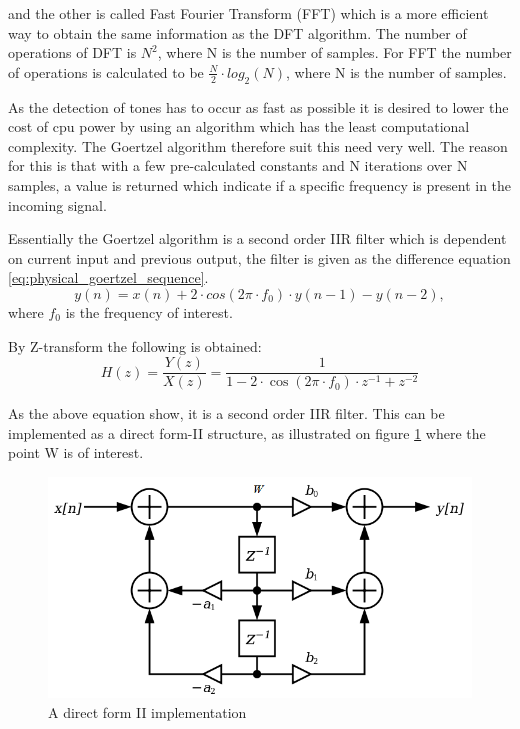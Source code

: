 	
	and the other is called Fast Fourier Transform (FFT) which is a more efficient way to obtain the same information
	as the DFT algorithm. The number of operations of DFT \cite[p. 124]{DSP} is $N^2$, where N is the number of samples.
	For FFT \cite[p. 124]{DSP} the number of operations is calculated to be $\frac{N}{2}\cdot log_{2}(N)$,
	where N is the number of samples.
	
	As the detection of tones has to occur as fast as possible it is desired to lower the cost of cpu power by using 
	an algorithm which has the least computational complexity. The Goertzel algorithm therefore suit this need very well.
	The reason for this is that with a few pre-calculated constants and N iterations over N samples, a value is returned
	which indicate if a specific frequency is present in the incoming signal.
	
	Essentially the Goertzel algorithm is a second order IIR filter which is dependent on current input and previous
	output, the filter is given as the difference equation \ref{eq:physical_goertzel_sequence}.
	\begin{equation}y(n) = x(n) + 2\cdot cos(2\pi \cdot f_{0})\cdot y(n - 1) - y(n - 2),\label{eq:physical_goertzel_sequence}\end{equation}
	where $f_{0}$ is the frequency of interest.
	
	By Z-transform the following is obtained:
	\begin{equation}H(z) = \frac{Y(z)}{X(z)} = \frac{1}{1 - 2\cdot \cos(2\pi \cdot f_{0})\cdot z^{-1} + z^{-2}}\end{equation}
	
	
	As the above equation show, it is a second order IIR filter. This can be implemented as a direct form-II structure, as illustrated on figure \ref{fig:physical_biquad_filter} where the point W is of interest.
	
	\begin{figure}[!h]
		\begin{center}
		\includegraphics[scale=0.6,trim=0 0 0 0]{content/graphics/physical/physical_biquad_filter.png}%
		\caption{A direct form II implementation}
		\label{fig:physical_biquad_filter}
		\end{center}
	\end{figure}
	
